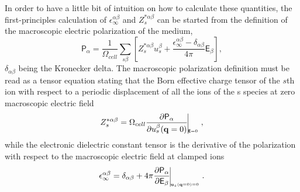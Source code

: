 In order to have a little bit of intuition on how to calculate these quantities, the first-principles calculation of $\epsilon_{\infty}^{\alpha\beta}$ and $Z_{s}^{*\alpha\beta}$ can be started from the definition of the macroscopic electric polarization of the medium, 
\begin{equation}
 \mathsf{P}_{\alpha}=\frac{1}{\Omega_{cell}}\sum_{s\beta}\left[Z^{*\alpha\beta}_{s}u_{s}^{\beta}+\frac{\epsilon_{\infty}^{\alpha\beta}-\delta_{\alpha\beta}}{4\pi}\mathsf{E}_{\beta}\right],
\end{equation}
$\delta_{\alpha\beta}$ being the Kronecker delta. The macroscopic polarization definition must be read as a tensor equation stating that the Born effective charge tensor of the $s$th ion with respect to a periodic displacement of 
all the ions of the s species at zero macroscopic electric field
\begin{equation}
 Z^{*\alpha\beta}_{s}=\Omega_{cell}\frac{\partial \mathsf{P}_{\alpha}}{\partial u_{s}^{\beta}(\mathbf{q}=0)}\vline_{_{_{_{_{_{_{_{\boldsymbol{\mathsf{E}}=0}}}}}}}},
\end{equation}
while the electronic dielectric constant tensor is the derivative of the polarization with respect to the macroscopic electric field at clamped ions
\begin{equation}
 \epsilon_{\infty}^{\alpha\beta}=\delta_{\alpha\beta}+4\pi\frac{\partial\mathsf{P}_{\alpha}}{\partial\mathsf{E}_{\beta}}\vline_{_{_{_{_{_{_{_{\mathbf{u}_{s}(\mathbf{q}=0)=0}}}}}}}}.
\end{equation}
\\

